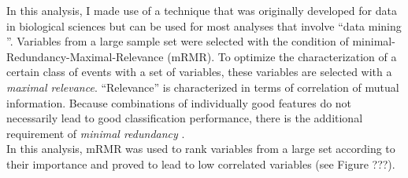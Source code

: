 In this analysis, I made use of a technique that was originally developed for data in biological sciences but can be used for most analyses that involve ``data mining ''. Variables from a large sample set were selected with the condition of minimal-Redundancy-Maximal-Relevance (mRMR). To optimize the characterization of a certain class of events with a set of variables, these variables are selected with a \textit{maximal relevance}. ``Relevance'' is characterized in terms of correlation of mutual information. Because combinations of individually good features do not necessarily lead to good classification performance, there is the additional requirement of \textit{minimal redundancy} \cite{1453511}.\\

\noindent In this analysis, mRMR was used to rank variables from a large set according to their importance and proved to lead to low correlated variables (see Figure ???).

